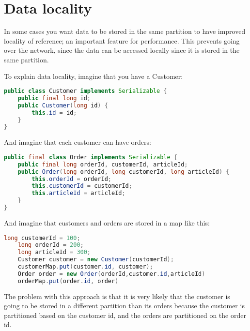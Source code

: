 \section{Data locality}
In some cases you want data to be stored in the same partition to have improved locality of reference; an important feature for performance. This prevents going over the network, since the data can be accessed locally since it is stored in the same partition.

To explain data locality, imagine that you have a Customer:
\begin{lstlisting}[language=java]
public class Customer implements Serializable {
    public final long id;
    public Customer(long id) {
        this.id = id;
    }
}
\end{lstlisting}
And imagine that each customer can have orders:
\begin{lstlisting}[language=java]
public final class Order implements Serializable {
    public final long orderId, customerId, articleId;
    public Order(long orderId, long customerId, long articleId) {
        this.orderId = orderId;
        this.customerId = customerId;
        this.articleId = articleId;
    }
}
\end{lstlisting}
And imagine that customers and orders are stored in a map like this:
\begin{lstlisting}[language=java]
    long customerId = 100;
    long orderId = 200;
    long articleId = 300;
    Customer customer = new Customer(customerId);
    customerMap.put(customer.id, customer);
    Order order = new Order(orderId,customer.id,articleId)
	orderMap.put(order.id, order)
\end{lstlisting}
The problem with this approach is that it is very likely that the customer is going to be stored in a different partition than its orders because the customer is partitioned based on the customer id, and the orders are partitioned on the order id.

